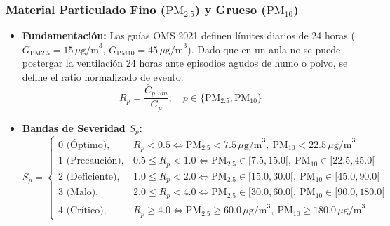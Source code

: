 \documentclass[11pt,a4paper]{article}
\begin{document}
\subsubsection{Material Particulado Fino (\texorpdfstring{$\text{PM}_{2.5}$}{PM2.5}) y Grueso (\texorpdfstring{$\text{PM}_{10}$}{PM10})}
\begin{itemize}
    \item \textbf{Fundamentación:} Las guías OMS 2021 definen límites diarios de 24 horas ($G_{\text{PM2.5}} = 15\,\mu\text{g/m}^3$, $G_{\text{PM10}} = 45\,\mu\text{g/m}^3$). Dado que en un aula no se puede postergar la ventilación 24 horas ante episodios agudos de humo o polvo, se define el ratio normalizado de evento:
    \begin{equation}
    R_p = \frac{\bar{C}_{p, 5m}}{G_p}, \quad p \in \{\text{PM}_{2.5}, \text{PM}_{10}\}
    \end{equation}
    \item \textbf{Bandas de Severidad $S_p$:}
    \begin{equation}
    S_p = \begin{cases}
    0\text{ (Óptimo)}, & R_p < 0.5 \iff \text{PM}_{2.5} < 7.5\,\mu\text{g/m}^3, \ \text{PM}_{10} < 22.5\,\mu\text{g/m}^3 \\
    1\text{ (Precaución)}, & 0.5 \le R_p < 1.0 \iff \text{PM}_{2.5} \in [7.5, 15.0[, \ \text{PM}_{10} \in [22.5, 45.0[ \\
    2\text{ (Deficiente)}, & 1.0 \le R_p < 2.0 \iff \text{PM}_{2.5} \in [15.0, 30.0[, \ \text{PM}_{10} \in [45.0, 90.0[ \\
    3\text{ (Malo)}, & 2.0 \le R_p < 4.0 \iff \text{PM}_{2.5} \in [30.0, 60.0[, \ \text{PM}_{10} \in [90.0, 180.0[ \\
    4\text{ (Crítico)}, & R_p \ge 4.0 \iff \text{PM}_{2.5} \ge 60.0\,\mu\text{g/m}^3, \ \text{PM}_{10} \ge 180.0\,\mu\text{g/m}^3
    \end{cases}
    \end{equation}
\end{itemize}

\clearpage
\end{document}
